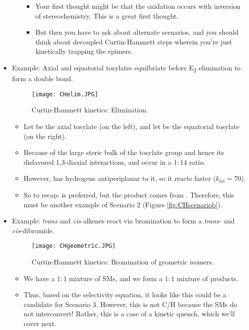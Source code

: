 \documentclass[../notes.tex]{subfiles}
\begin{document}
\begin{itemize}
\begin{itemize}
\begin{itemize}
            \item Your first thought might be that the oxidation occurs with inversion of stereochemistry. This is a great first thought.
            \item But then you have to ask about alternate scenarios, and you should think about decoupled Curtin-Hammett steps wherein you're just kinetically trapping the epimers.
        \end{itemize}
    \end{itemize}
    \item Example: Axial and equatorial tosylates equilbriate before E\textsubscript{2} elimination to form a double bond.
    \begin{figure}[H]
        \centering
        \texttt{[image: CHelim.JPG]}
        \caption{Curtin-Hammett kinetics: Elimination.}
        \label{fig:CHelim}
    \end{figure}
    \begin{itemize}
        \item Let  be the axial tosylate (on the left), and let  be the equatorial tosylate (on the right).
        \item Because of the large steric bulk of the tosylate group and hence its disfavored 1,3-diaxial interactions,  and  occur in a $1:14$ ratio.
        \item However,  has hydrogens antiperiplanar to it, so it reacts faster ($k_\text{rel}=70$).
        \item So to recap:  is preferred, but the product comes from . Therefore, this must be another example of Scenario 2 (Figure \ref{fig:CHscenariob}).
    \end{itemize}
    \item Example: \emph{trans} and \emph{cis} alkenes react via bromination to form a \emph{trans}- and \emph{cis}-dibromide.
    \begin{figure}[h!]
        \centering
        \texttt{[image: CHgeometric.JPG]}
        \caption{Curtin-Hammett kinetics: Bromination of geometric isomers.}
        \label{fig:CHgeometric}
    \end{figure}
    \begin{itemize}
        \item We have a $1:1$ mixture of SMs, and we form a $1:1$ mixture of products.
        \item Thus, based on the selectivity equation, it looks like this could be a candidate for Scenario 3. However, this is not C/H because the SMs do not interconvert! Rather, this is a case of a kinetic quench, which we'll cover next.

\end{itemize}
\end{itemize}
\end{document}
